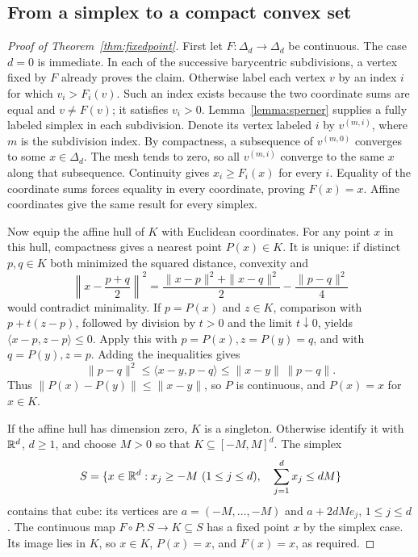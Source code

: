 \subsection{From a simplex to a compact convex set}

\begin{proof}[Proof of Theorem~\ref{thm:fixedpoint}]
First let \(F:\Delta_d\to\Delta_d\) be continuous. The case
\(d=0\) is immediate. In each of the successive barycentric
subdivisions, a vertex fixed by \(F\) already proves the claim.
Otherwise label each vertex \(v\) by an index \(i\) for which
\(v_i>F_i(v)\). Such an index exists because the two coordinate
sums are equal and \(v\ne F(v)\); it satisfies \(v_i>0\).
Lemma~\ref{lemma:sperner} supplies a fully labeled simplex in each
subdivision. Denote its vertex labeled \(i\) by \(v^{(m,i)}\),
where \(m\) is the subdivision index. By compactness, a subsequence
of \(v^{(m,0)}\) converges to some \(x\in\Delta_d\).
The mesh tends to zero, so all \(v^{(m,i)}\) converge to the same
\(x\) along that subsequence. Continuity gives
\(x_i\ge F_i(x)\) for every \(i\). Equality of the coordinate
sums forces equality in every coordinate, proving \(F(x)=x\).
Affine coordinates give the same result for every simplex.

Now equip the affine hull of \(K\) with Euclidean coordinates.
For any point \(x\) in this hull, compactness gives a nearest
point \(P(x)\in K\). It is unique: if distinct \(p,q\in K\)
both minimized the squared distance, convexity and
\[
 \left\|x-\frac{p+q}{2}\right\|^2
 =\frac{\|x-p\|^2+\|x-q\|^2}{2}
  -\frac{\|p-q\|^2}{4}
\]
would contradict minimality. If \(p=P(x)\) and \(z\in K\),
comparison with \(p+t(z-p)\), followed by division by \(t>0\)
and the limit \(t\downarrow0\), yields
\(\langle x-p,z-p\rangle\le0\).
Apply this with \(p=P(x),z=P(y)=q\), and with \(q=P(y),z=p\).
Adding the inequalities gives
\[
 \|p-q\|^2\le\langle x-y,p-q\rangle
              \le\|x-y\|\,\|p-q\|.
\]
Thus \(\|P(x)-P(y)\|\le\|x-y\|\), so \(P\) is continuous,
and \(P(x)=x\) for \(x\in K\).

If the affine hull has dimension zero, \(K\) is a singleton.
Otherwise identify it with \(\mathbb R^d\), \(d\ge1\), and choose
\(M>0\) so that \(K\subseteq[-M,M]^d\). The simplex
\[
 S=\{x\in\mathbb R^d:x_j\ge-M\ (1\le j\le d),\quad
                         \sum_{j=1}^d x_j\le dM\}
\]
contains that cube: its vertices are
\(a=(-M,\ldots,-M)\) and \(a+2dM e_j\), \(1\le j\le d\).
The continuous map \(F\circ P:S\to K\subseteq S\) has a fixed
point \(x\) by the simplex case. Its image lies in \(K\), so
\(x\in K\), \(P(x)=x\), and \(F(x)=x\), as required.
\end{proof}
